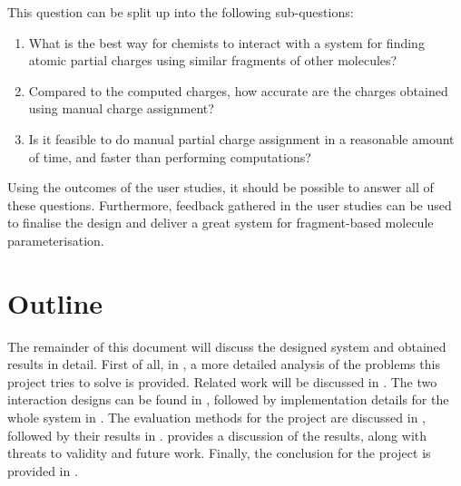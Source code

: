 This question can be split up into the following sub-questions:
\begin{enumerate}
\item What is the best way for chemists to interact with a system for finding atomic partial charges using similar fragments of other molecules?
\item Compared to the computed charges, how accurate are the charges obtained using manual charge assignment?
\item Is it feasible to do manual partial charge assignment in a reasonable amount of time, and faster than performing computations?
\end{enumerate}
Using the outcomes of the user studies, it should be possible to answer all of these questions. Furthermore, feedback gathered in the user studies can be used to finalise the design and deliver a great system for fragment-based molecule parameterisation.

\section{Outline}
The remainder of this document will discuss the designed system and obtained results in detail. First of all, in , a more detailed analysis of the problems this project tries to solve is provided. Related work will be discussed in . The two interaction designs can be found in , followed by implementation details for the whole system in . The evaluation methods for the project are discussed in , followed by their results in .  provides a discussion of the results, along with threats to validity and future work. Finally, the conclusion for the project is provided in .

